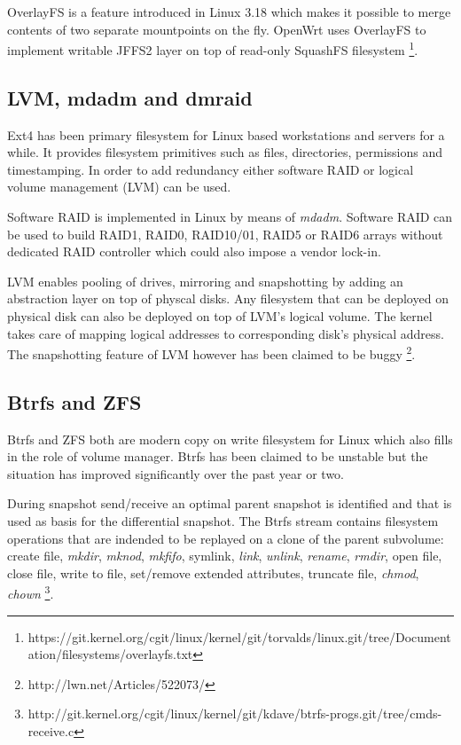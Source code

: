 \documentclass{article}
\begin{document}
OverlayFS is a feature introduced in Linux 3.18 which makes it possible to merge contents of two separate mountpoints on the fly.
OpenWrt uses OverlayFS to implement writable JFFS2 layer on top of read-only SquashFS filesystem
\footnote{https://git.kernel.org/cgit/linux/kernel/git/torvalds/linux.git/tree/Documentation/filesystems/overlayfs.txt}.

\subsection{LVM, mdadm and dmraid}

Ext4 has been primary filesystem for Linux based workstations and servers for
a while. It provides filesystem primitives such as files, directories,
permissions and timestamping. In order to add redundancy either software RAID
or logical volume management (LVM) can be used.

Software RAID is implemented in Linux by means of \emph{mdadm}. Software RAID
can be used to build RAID1, RAID0, RAID10/01, RAID5 or RAID6 arrays without
dedicated RAID controller which could also impose a vendor lock-in.

LVM enables pooling of drives, mirroring and snapshotting by adding an
abstraction layer on top of physcal disks. Any filesystem that can be deployed
on physical disk can also be deployed on top of LVM's logical volume. The
kernel takes care of mapping logical addresses to corresponding disk's physical
address. The snapshotting feature of LVM however has been claimed to be buggy
\footnote{http://lwn.net/Articles/522073/}.

\subsection{Btrfs and ZFS}

Btrfs and ZFS both are modern copy on write filesystem for Linux which also
fills in the role of volume manager. Btrfs has been claimed to be unstable but
the situation has improved significantly over the past year or two. 

During snapshot send/receive an optimal parent snapshot is identified and that
is used as basis for the differential snapshot. The Btrfs stream contains
filesystem operations that are indended to be replayed on a clone of the
parent subvolume: create file, \emph{mkdir}, \emph{mknod}, \emph{mkfifo},
symlink, \emph{link}, \emph{unlink}, \emph{rename}, \emph{rmdir}, open file,
close file, write to file, set/remove extended attributes, truncate file,
\emph{chmod}, \emph{chown}
\footnote{http://git.kernel.org/cgit/linux/kernel/git/kdave/btrfs-progs.git/tree/cmds-receive.c}.
\end{document}
